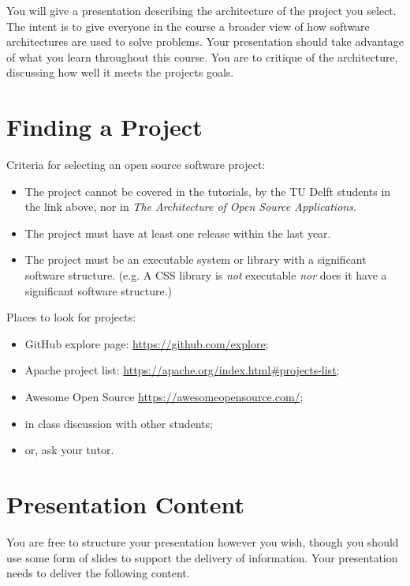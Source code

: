 \documentclass{csse4400}
\begin{document}
You will give a presentation describing the architecture of the project you select.
The intent is to give everyone in the course a broader view of how software architectures are used to solve problems.
Your presentation should take advantage of what you learn throughout this course.
You are to critique of the architecture, discussing how well it meets the projects goals.


\section{Finding a Project}
Criteria for selecting an open source software project:
\begin{itemize}[topsep=4pt,partopsep=1pt,itemsep=2pt,parsep=2pt]
    \item The project cannot be covered in the tutorials, by the TU Delft students in the link above,
          nor in \textit{The Architecture of Open Source Applications}.
    \item The project must have at least one release within the last year.
    \item The project must be an executable system or library with a significant software structure.
          (e.g. A CSS library is \textit{not} executable \textit{nor} does it have a significant software structure.)
\end{itemize}

\noindent%
 Places to look for projects:
\begin{itemize}[topsep=4pt,partopsep=1pt,itemsep=2pt,parsep=2pt]
    \item GitHub explore page: \url{https://github.com/explore};
    \item Apache project list: \url{https://apache.org/index.html#projects-list};
    \item Awesome Open Source \url{https://awesomeopensource.com/};
    \item in class discussion with other students;
    \item or, ask your tutor.
\end{itemize}


\section{Presentation Content}
You are free to structure your presentation however you wish,
though you should use some form of slides to support the delivery of information.
Your presentation needs to deliver the following content.
\end{document}
